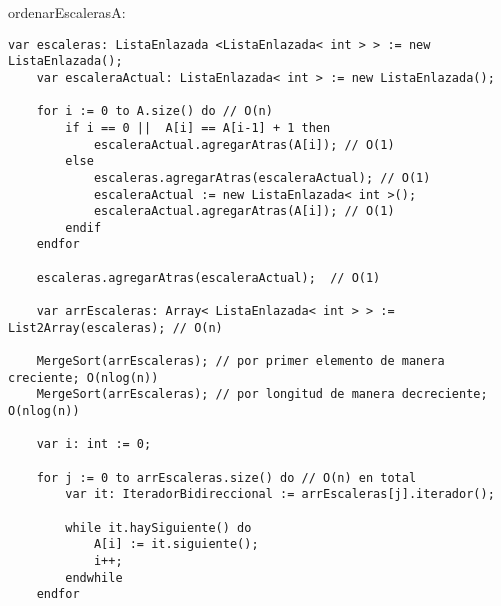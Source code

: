 \begin{proc}{ordenarEscaleras}{\Inout A: \Array{\Int}}{}
    \begin{lstlisting}[numbers=none,frame=none]
    var escaleras: ListaEnlazada <ListaEnlazada< int > > := new ListaEnlazada();
    var escaleraActual: ListaEnlazada< int > := new ListaEnlazada();

    for i := 0 to A.size() do // O(n)
        if i == 0 ||  A[i] == A[i-1] + 1 then
            escaleraActual.agregarAtras(A[i]); // O(1)
        else
            escaleras.agregarAtras(escaleraActual); // O(1)
            escaleraActual := new ListaEnlazada< int >();
            escaleraActual.agregarAtras(A[i]); // O(1)
        endif
    endfor

    escaleras.agregarAtras(escaleraActual);  // O(1)

    var arrEscaleras: Array< ListaEnlazada< int > > := List2Array(escaleras); // O(n)

    MergeSort(arrEscaleras); // por primer elemento de manera creciente; O(nlog(n))
    MergeSort(arrEscaleras); // por longitud de manera decreciente; O(nlog(n))

    var i: int := 0;

    for j := 0 to arrEscaleras.size() do // O(n) en total
        var it: IteradorBidireccional := arrEscaleras[j].iterador();

        while it.haySiguiente() do
            A[i] := it.siguiente();
            i++;
        endwhile
    endfor
    \end{lstlisting}
\end{proc}

